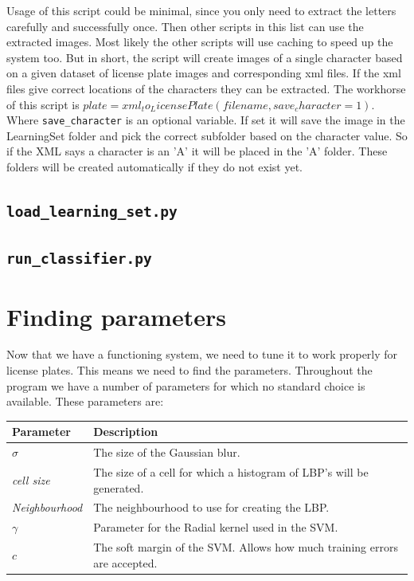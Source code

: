 \documentclass[a4paper]{article}
\begin{document}
Usage of this script could be minimal, since you only need to extract the
letters carefully and successfully once. Then other scripts in this list can
use the extracted images. Most likely the other scripts will use caching to
speed up the system too. But in short, the script will create images of a
single character based on a given dataset of license plate images and
corresponding xml files. If the xml files give correct locations of the
characters they can be extracted. The workhorse of this script is $plate =
xml_to_LicensePlate(filename, save_character=1)$. Where
\texttt{save\_character} is an optional variable. If set it will save the image
in the LearningSet folder and pick the correct subfolder based on the character
value. So if the XML says a character is an 'A' it will be placed in the 'A'
folder. These folders will be created automatically if they do not exist yet.

\subsection*{\texttt{load\_learning\_set.py}}



\subsection*{\texttt{run\_classifier.py}}



\section{Finding parameters}

Now that we have a functioning system, we need to tune it to work properly for
license plates. This means we need to find the parameters. Throughout the
program we have a number of parameters for which no standard choice is
available. These parameters are:

\begin{tabular}{l|l}
	Parameter 			& Description \\
	\hline
	$\sigma$  			& The size of the Gaussian blur. \\
	\emph{cell size}	& The size of a cell for which a histogram of LBP's
	                      will be generated. \\
	\emph{Neighbourhood}& The neighbourhood to use for creating the LBP. \\
	$\gamma$			& Parameter for the Radial kernel used in the SVM. \\
	$c$					& The soft margin of the SVM. Allows how much training
						  errors are accepted. \\
\end{tabular}
\end{document}
